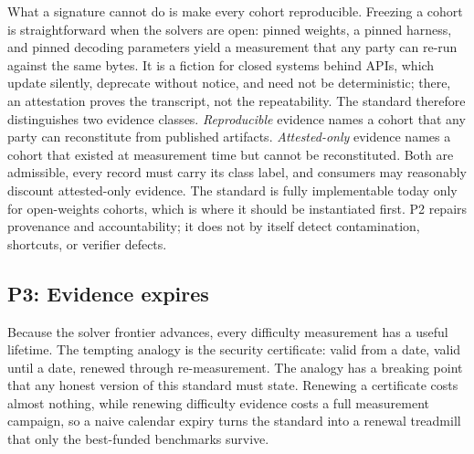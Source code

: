 \documentclass[11pt]{article}
\begin{document}
What a signature cannot do is make every cohort reproducible. Freezing a cohort is straightforward when the solvers are open: pinned weights, a pinned harness, and pinned decoding parameters yield a measurement that any party can re-run against the same bytes. It is a fiction for closed systems behind APIs, which update silently, deprecate without notice, and need not be deterministic; there, an attestation proves the transcript, not the repeatability. The standard therefore distinguishes two evidence classes. \emph{Reproducible} evidence names a cohort that any party can reconstitute from published artifacts. \emph{Attested-only} evidence names a cohort that existed at measurement time but cannot be reconstituted. Both are admissible, every record must carry its class label, and consumers may reasonably discount attested-only evidence. The standard is fully implementable today only for open-weights cohorts, which is where it should be instantiated first. P2 repairs provenance and accountability; it does not by itself detect contamination, shortcuts, or verifier defects.

\subsection{P3: Evidence expires}

Because the solver frontier advances, every difficulty measurement has a useful lifetime. The tempting analogy is the security certificate: valid from a date, valid until a date, renewed through re-measurement. The analogy has a breaking point that any honest version of this standard must state. Renewing a certificate costs almost nothing, while renewing difficulty evidence costs a full measurement campaign, so a naive calendar expiry turns the standard into a renewal treadmill that only the best-funded benchmarks survive.
\end{document}
